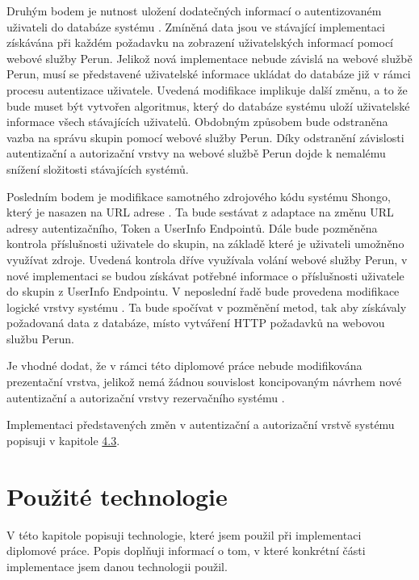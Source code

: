 \documentclass[
  printed, %
  twoside, %
  table,   %
  nolof,     %
  nolot,     %
]{fithesis3}
\begin{document}
Druhým bodem je nutnost uložení dodatečných informací o autentizovaném uživateli do databáze systému . Zmíněná data jsou ve stávající implementaci získávána při každém požadavku na zobrazení uživatelských informací pomocí webové služby Perun. Jelikož nová implementace nebude závislá na webové službě Perun, musí se představené uživatelské informace ukládat do databáze již v rámci procesu autentizace uživatele. Uvedená modifikace implikuje další změnu, a to že bude muset být vytvořen algoritmus, který do databáze systému  uloží uživatelské informace všech stávajících uživatelů. Obdobným způsobem bude odstraněna vazba na správu skupin pomocí webové služby Perun. Díky odstranění závislosti autentizační a autorizační vrstvy na webové službě Perun dojde k nemalému snížení složitosti stávajících systémů. 
\par 

Posledním bodem je modifikace samotného zdrojového kódu systému Shongo, který je nasazen na URL adrese . Ta bude sestávat z adaptace na změnu URL adresy autentizačního, Token a UserInfo Endpointů. Dále bude pozměněna kontrola příslušnosti uživatele do skupin, na základě které je uživateli umožněno využívat zdroje. Uvedená kontrola dříve využívala volání webové služby Perun, v nové implementaci se budou získávat potřebné informace o příslušnosti uživatele do skupin z UserInfo Endpointu. V neposlední řadě bude provedena modifikace logické vrstvy systému . Ta bude spočívat v pozměnění metod, tak aby získávaly požadovaná data z databáze, místo vytváření HTTP požadavků na webovou službu Perun. 

\par 

Je vhodné dodat, že v rámci této diplomové práce nebude modifikována prezentační vrstva, jelikož nemá žádnou souvislost koncipovaným návrhem nové autentizační a autorizační vrstvy rezervačního systému .

\par

Implementaci představených změn v autentizační a autorizační vrstvě systému  popisuji v kapitole \hyperref[ShongoImpl]{4.3}.

\chapter{Použité technologie}
V této kapitole popisuji technologie, které jsem použil při implementaci diplomové práce. Popis doplňuji informací o tom, v které konkrétní části implementace jsem danou technologii použil.
\end{document}
